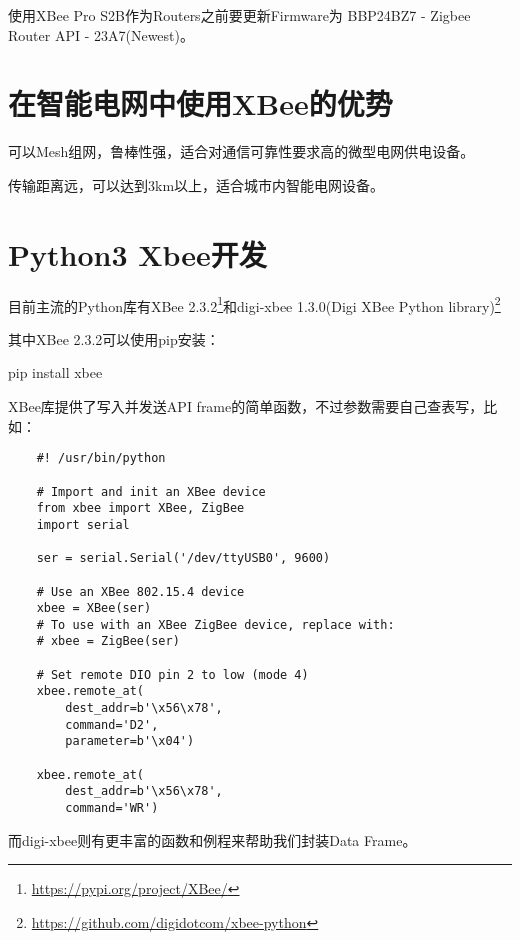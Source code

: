 使用XBee Pro S2B作为Routers之前要更新Firmware为 BBP24BZ7 - Zigbee Router API - 23A7(Newest)。





\section{在智能电网中使用XBee的优势}

可以Mesh组网，鲁棒性强，适合对通信可靠性要求高的微型电网供电设备。

传输距离远，可以达到3km以上，适合城市内智能电网设备。


\section{Python3 Xbee开发}

目前主流的Python库有XBee 2.3.2\footnote{\url{https://pypi.org/project/XBee/}}和digi-xbee 1.3.0(Digi XBee Python library)\footnote{\url{https://github.com/digidotcom/xbee-python}}

其中XBee 2.3.2可以使用pip安装：

\begin{tcolorbox}
    pip install xbee
\end{tcolorbox}

XBee库提供了写入并发送API frame的简单函数，不过参数需要自己查表写，比如：

\begin{verbatim}
    #! /usr/bin/python

    # Import and init an XBee device
    from xbee import XBee, ZigBee
    import serial

    ser = serial.Serial('/dev/ttyUSB0', 9600)

    # Use an XBee 802.15.4 device
    xbee = XBee(ser)
    # To use with an XBee ZigBee device, replace with:
    # xbee = ZigBee(ser)

    # Set remote DIO pin 2 to low (mode 4)
    xbee.remote_at(
        dest_addr=b'\x56\x78',
        command='D2',
        parameter=b'\x04')

    xbee.remote_at(
        dest_addr=b'\x56\x78',
        command='WR')
\end{verbatim}

而digi-xbee则有更丰富的函数和例程来帮助我们封装Data Frame。